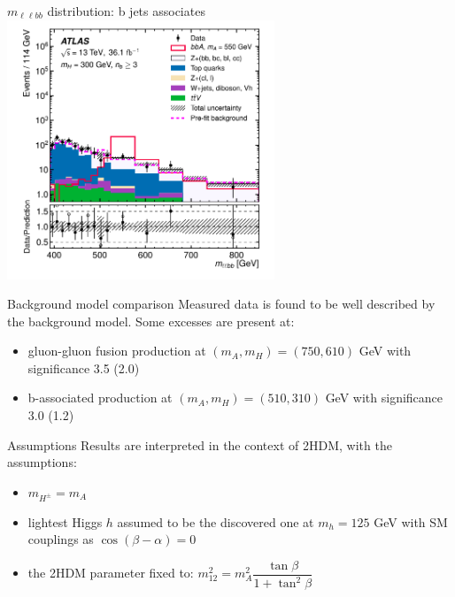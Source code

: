 \documentclass[10pt]{beamer} %
\begin{document}
\begin{frame}{$m_{\ell\ell b b}$ distribution: b jets associates}
        \centering
        \includegraphics[width=0.6\textwidth]{Figs/mllbb_distribution_bb.png}
        \caption{}
        \label{fig:mllbb-distribution} 
\end{frame}


\begin{frame}{Background model comparison}
    Measured data is found to be well described by the background model. Some excesses are present at:
    \begin{itemize}
        \item gluon-gluon fusion production at $(m_A, m_H) = (750, 610)$ GeV with significance 3.5 (2.0)
        \item b-associated production at $(m_A, m_H) = (510, 310)$ GeV with significance 3.0 (1.2)
    \end{itemize}
\end{frame}


\begin{frame}{Assumptions}
    Results are interpreted in the context of 2HDM, with the assumptions:
    \begin{itemize}
        \item $m_{H^\pm} = m_A$
        \item lightest Higgs $h$ assumed to be the discovered one at $m_h=125$ GeV with SM couplings as $\cos (\beta - \alpha) = 0$
        \item the 2HDM parameter fixed to: $m_{12}^2 = m_A^2 \dfrac{\tan \beta}{1 + \tan^2 \beta}$
    \end{itemize}
\end{frame}
\end{document}

